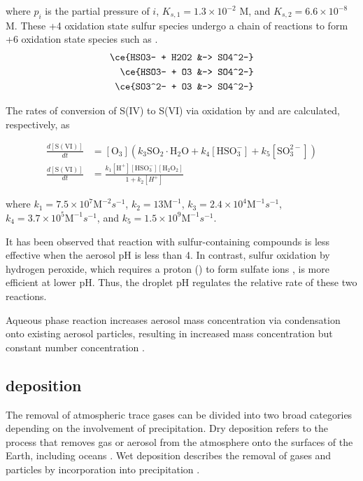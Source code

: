 where $p_i$ is the partial pressure of $i$,  
$K_{s,1} = 1.3 \times 10^{-2}$ M, and 
$K_{s,2} = 6.6 \times 10^{-8}$ M.  
These +4 oxidation state sulfur species undergo a chain of reactions to form +6 oxidation state species such as . 
\begin{align}
    \ce{HSO3- + H2O2 &-> SO4^2-} \\
    \ce{HSO3- + O3 &-> SO4^2-} \\
    \ce{SO3^2- + O3 &-> SO4^2-} 
\end{align}

The rates of conversion of S(IV) to S(VI) via oxidation by  and  are calculated, respectively, as

\begin{align}
    \frac{d[\mathrm{S(VI)}]}{dt} & = [\mathrm{O_3}]( k_3 \mathrm{SO_2 \cdot H_2O} + k_4 [\mathrm{HSO_3^-}] + k_5 [\mathrm{SO_3^{2-}}]) \label{ch1:eq:so2-o3} \\
    \frac{d[\mathrm{S(VI)}]}{dt} & = \frac{k_1 \mathrm{[H^+][HSO_3^-][H_2O_2]}}{1+k_2[H^+]} \label{ch1:eq:so2-h2o2}
\end{align}

where 
$k_1 = 7.5 \times 10^7 \mathrm{M}^{-2}s^{-1}$,
$k_2 = 13 \mathrm{M}^{-1}$,
$k_3 = 2.4 \times 10^4 \mathrm{M}^{-1}s^{-1}$,
$k_4 = 3.7 \times 10^5 \mathrm{M}^{-1}s^{-1}$, and
$k_5 = 1.5 \times 10^9 \mathrm{M}^{-1}s^{-1}$. 

It has been observed that  reaction with sulfur-containing compounds is less effective when the aerosol pH is less than 4. In contrast, sulfur oxidation by hydrogen peroxide, which requires a proton () to form sulfate ions \citep{seinfeldAtmosphericChemistryPhysics2016}, is more efficient at lower pH. Thus, the droplet pH regulates the relative rate of these two reactions. 

Aqueous phase reaction increases aerosol mass concentration via condensation onto existing aerosol particles, resulting in increased mass concentration but constant number concentration \citep{seinfeldAtmosphericChemistryPhysics2016}.


\subsection{\textsoo{} deposition}

The removal of atmospheric trace gases can be divided into two broad categories depending on the involvement of precipitation. Dry deposition refers to the process that removes gas or aerosol from the atmosphere onto the surfaces of the Earth, including oceans \citep{dewysAssessmentFateSulfur1978}.  Wet deposition describes the removal of gases and particles by incorporation into precipitation \citep{wayneChemistryAtmospheresIntroduction2006}. 

